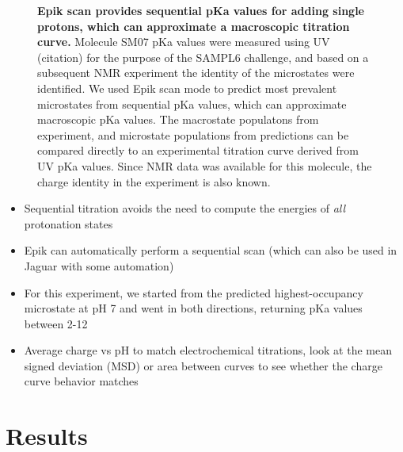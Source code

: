 \documentclass[9pt,lineno,final]{elife}
\begin{document}
\begin{figure}[H]
		\caption{{\bf Epik scan provides sequential pKa values for adding single protons, which can approximate a macroscopic titration curve.} Molecule SM07 pKa values were measured using UV (citation) for the purpose of the SAMPL6 challenge, and based on a subsequent NMR experiment the identity of the microstates were identified. We used Epik scan mode to predict most prevalent microstates from sequential pKa values, which can approximate macroscopic pKa values. The macrostate populatons from experiment, and microstate populations from predictions can be compared directly to an experimental titration curve derived from UV pKa values. Since NMR data was available for this molecule, the charge identity in the experiment is also known. 
	\label{fig:scan-prediction}}
	
\end{figure}


\begin{itemize}
	\item Sequential titration avoids the need to compute the energies of \emph{all} protonation states
	\item Epik can automatically perform a sequential scan (which can also be used in Jaguar with some automation)
	\item For this experiment, we started from the predicted highest-occupancy microstate at pH 7 and went in both directions, returning pKa values between 2-12
	\item Average charge vs pH to match electrochemical titrations, look at the mean signed deviation (MSD) or area between curves to see whether the charge curve behavior matches
\end{itemize}


\section{Results}
\end{document}
